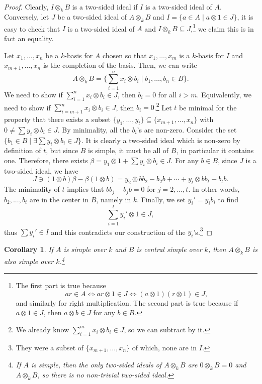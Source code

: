\documentclass{tufte-handout} %
\newtheorem{cor}[thm]{Corollary}
\theoremstyle{definition}
\theoremstyle{remark}
\begin{document}
\begin{proof}
	Clearly, $I \otimes_k B$ is a two-sided ideal if $I$ is a two-sided ideal of $A$. Conversely, let $J$ be a two-sided ideal of $A \otimes_k B$ and $I = \{a \in A \mid a \otimes 1 \in J\}$, it is easy to check that $I$ is a two-sided ideal of $A$ and $I \otimes_k B \subseteq J$,\footnote{The first part is true because \[ar \in A \Leftrightarrow ar \otimes 1 \in J \Leftrightarrow (a\otimes 1)(r \otimes 1) \in J,\]and similarly for right multiplication. The second part is true because if $a \otimes 1 \in J$, then $a \otimes b \in J$ for any $b \in B$.} we claim this is in fact an equality.
	
	Let $x_1, \dots, x_n$ be a $k$-basis for $A$ chosen so that $x_1, \dots, x_m$ is a $k$-basis for $I$ and $x_{m+1}, \dots, x_n$ is the completion of the basis. Then, we can write
	\[A \otimes_k B = \{\sum_{i=1}^n x_i \otimes b_i \mid b_1, \dots, b_n \in B\}.\]
	We need to show if $\sum_{i=1}^n x_i \otimes b_i \in J$, then $b_i = 0$ for all $i > m$. Equivalently, we need to show if $\sum_{i = m+1}^n x_i \otimes b_i \in J$, then $b_i = 0$.\footnote{We already know $\sum_{i=1}^m x_i \otimes b_i \in J$, so we can subtract by it.} Let $t$ be minimal for the property that there exists a subset $\{y_1, \dots, y_t\} \subseteq \{x_{m+1}, \dots, x_n\}$ with $0 \neq \sum y_i \otimes b_i \in J$. By minimality, all the $b_i$'s are non-zero. Consider the set $\{b_1 \in B \mid \exists \sum y_i \otimes b_i \in J\}$. It is clearly a two-sided ideal which is non-zero by definition of $t$, but since $B$ is simple, it must be all of $B$, in particular it contains one. Therefore, there exists $\beta = y_1 \otimes 1 + \sum y_i \otimes b_i \in J$. For any $b \in B$, since $J$ is a two-sided ideal, we have \[J \ni (1 \otimes b)\beta - \beta(1 \otimes b) = y_2 \otimes bb_2-b_2b + \cdots + y_t \otimes bb_t - b_tb.\]
	The minimality of $t$ implies that $bb_j - b_jb = 0$ for $j = 2,...,t$. In other words, $b_2,..., b_t$ are in the center in $B$, namely in $k$. Finally, we set $y_i' = y_ib_i$ to find 
	\[\sum_{i=1}^t y_i' \otimes 1 \in J,\]
	thus $\sum y_i' \in I$ and this contradicts our construction of the $y_i$'s.\footnote{They were a subset of $\{x_{m+1}, \dots, x_n\}$ of which, none are in $I$.}
\end{proof}
\begin{cor}\label{tensorsimple}
	If $A$ is simple over $k$ and $B$ is central simple over $k$, then $A \otimes_k B$ is also simple over $k$.\footnote{If $A$ is simple, then the only two-sided ideals of $A \otimes_k B$ are $0 \otimes_k B = 0$ and $A \otimes_k B$, so there is no non-trivial two-sided ideal.}
\end{cor}
\end{document}
